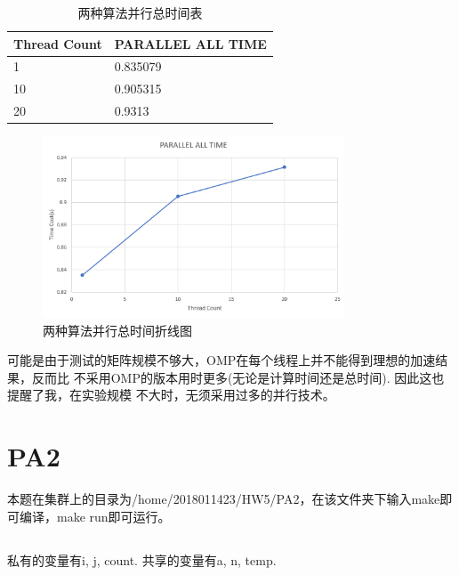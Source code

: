 \documentclass[UTF8]{article}
\begin{document}
        \begin{table}[h]
            \caption{两种算法并行总时间表}
            \centering

            \label{tab:my-table}
            \begin{tabular}{|l|l|}
            \hline
            Thread Count & PARALLEL ALL TIME \\ \hline
            1            & 0.835079          \\ \hline
            10           & 0.905315          \\ \hline
            20           & 0.9313            \\ \hline
            \end{tabular}
            \end{table}


                \begin{figure}[h]
                    \label{Ratio}
                    \centering
                        \includegraphics[width=0.8\textwidth]{cmpa.png}
                        \caption{两种算法并行总时间折线图}
                    \end{figure}
可能是由于测试的矩阵规模不够大，OMP在每个线程上并不能得到理想的加速结果，反而比
不采用OMP的版本用时更多(无论是计算时间还是总时间). 因此这也提醒了我，在实验规模
不大时，无须采用过多的并行技术。


\clearpage

\section{PA2}
本题在集群上的目录为/home/2018011423/HW5/PA2，在该文件夹下输入make即可编译，make run即可运行。

\subsection{}
私有的变量有i, j, count. 共享的变量有a, n, temp.
\end{document}
